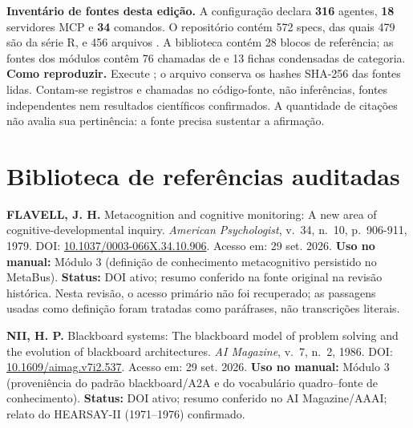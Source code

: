 \begin{resultado}
\textbf{Inventário de fontes desta edição.} A configuração declara
\textbf{316} agentes, \textbf{18} servidores MCP e
\textbf{34} comandos. O repositório contém 572 specs,
das quais 479 são da série R, e 456 arquivos
. A biblioteca contém 28 blocos de referência;
as fontes dos módulos contêm 76 chamadas de \cod{\string\citref}
e 13 fichas condensadas de categoria.
\textbf{Como reproduzir.} Execute ;
o arquivo  conserva os hashes SHA-256 das
fontes lidas. Contam-se registros e chamadas no código-fonte, não inferências,
fontes independentes nem resultados científicos confirmados. A quantidade de
citações não avalia sua pertinência: a fonte precisa sustentar a afirmação.
\end{resultado}

\section{Biblioteca de referências auditadas}

\begin{referencia}
\textbf{FLAVELL, J. H.} Metacognition and cognitive monitoring: A new area of
cognitive-developmental inquiry. \emph{American Psychologist}, v.~34, n.~10,
p.~906-911, 1979. DOI: \href{https://doi.org/10.1037/0003-066X.34.10.906}{10.1037/0003-066X.34.10.906}. Acesso em: 29 set. 2026.
\textbf{Uso no manual:} Módulo 3 (definição de conhecimento metacognitivo
persistido no MetaBus). \textbf{Status:} DOI ativo; resumo conferido na fonte
original na revisão histórica. Nesta revisão, o acesso primário não foi recuperado; as passagens usadas como definição foram tratadas como paráfrases, não transcrições literais.
\end{referencia}

\begin{referencia}
\textbf{NII, H. P.} Blackboard systems: The blackboard model of problem solving
and the evolution of blackboard architectures. \emph{AI Magazine}, v.~7, n.~2,
1986. DOI: \href{https://doi.org/10.1609/aimag.v7i2.537}{10.1609/aimag.v7i2.537}. Acesso em: 29 set. 2026.
\textbf{Uso no manual:} Módulo 3 (proveniência do padrão blackboard/A2A e do
vocabulário quadro--fonte de conhecimento). \textbf{Status:} DOI ativo; resumo
conferido no AI Magazine/AAAI; relato do HEARSAY-II (1971--1976) confirmado.
\end{referencia}

